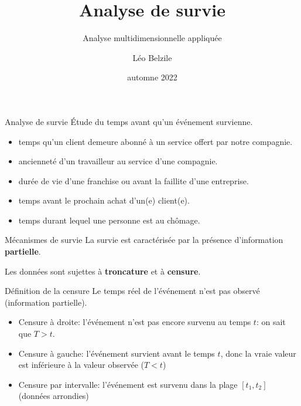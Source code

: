 \documentclass[
  ignorenonframetext,
]{beamer}
\title{Analyse de survie}
\subtitle{Analyse multidimensionnelle appliquée}
\author{Léo Belzile}
\date{automne 2022}
\institute{HEC Montréal}
\providecommand{\tightlist}{%
  \setlength{\itemsep}{0pt}\setlength{\parskip}{0pt}}\usepackage{longtable,booktabs,array}
\begin{document}
\frame{\titlepage}
\ifdefined\Shaded\renewenvironment{Shaded}{\begin{tcolorbox}[borderline west={3pt}{0pt}{shadecolor}, interior hidden, breakable, sharp corners, boxrule=0pt, enhanced, frame hidden]}{\end{tcolorbox}}\fi

\begin{frame}{Analyse de survie}
\protect\hypertarget{analyse-de-survie}{}
Étude du temps avant qu'un événement survienne.

\begin{itemize}
\tightlist
\item
  temps qu'un client demeure abonné à un service offert par notre
  compagnie.
\item
  ancienneté d'un travailleur au service d'une compagnie.
\item
  durée de vie d'une franchise ou avant la faillite d'une entreprise.
\item
  temps avant le prochain achat d'un(e) client(e).
\item
  temps durant lequel une personne est au chômage.
\end{itemize}
\end{frame}

\begin{frame}{Mécanismes de survie}
\protect\hypertarget{muxe9canismes-de-survie}{}
La survie est caractérisée par la présence d'information
\textbf{partielle}.

Les données sont sujettes à \textbf{troncature} et à \textbf{censure}.
\end{frame}

\begin{frame}{Définition de la censure}
\protect\hypertarget{duxe9finition-de-la-censure}{}
Le temps réel de l'événement n'est pas observé (information partielle).

\begin{itemize}
\tightlist
\item
  Censure à droite: l'événement n'est pas encore survenu au temps \(t\):
  on sait que \(T > t\).
\item
  Censure à gauche: l'événement survient avant le temps \(t\), donc la
  vraie valeur est inférieure à la valeur observée (\(T < t\))
\item
  Censure par intervalle: l'événement est survenu dans la plage
  \([t_1, t_2]\) (données arrondies)
\end{itemize}
\end{frame}
\end{document}
